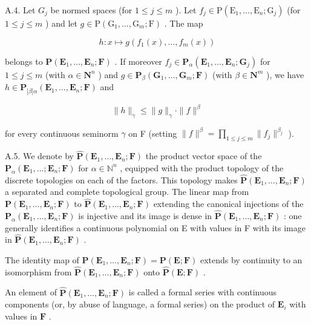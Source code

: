 A.4. Let \(G_{j}\) be normed spaces (for \(1 \leqslant j \leqslant m\) ). Let \(f_{j} \in \mathrm{P}(\mathrm{E}_{1}, \ldots, \mathrm{E}_{n}; \mathrm{G}_{j})\) (for \(1 \leqslant j \leqslant m\) ) and let \(g \in \mathrm{P}(\mathrm{G}_{1}, \ldots, \mathrm{G}_{m}; \mathrm{F})\) . The map

\[
h: x \mapsto g (f _ {1} (x), \dots , f _ {m} (x))
\]

belongs to \(\mathbf{P}(\mathbf{E}_1,\ldots ,\mathbf{E}_n;\mathbf{F})\) . If moreover \(f_{j}\in \mathbf{P}_{\alpha}(\mathbf{E}_{1},\ldots ,\mathbf{E}_{n};\mathbf{G}_{j})\) for \(1\leqslant j\leqslant m\) (with \(\alpha \in \mathbf{N}^n\) ) and \(g\in \mathbf{P}_{\beta}(\mathbf{G}_1,\ldots ,\mathbf{G}_m;\mathbf{F})\) (with \(\beta \in \mathbf{N}^{m}\) ), we have \(h\in \mathbf{P}_{|\beta |\alpha}(\mathbf{E}_1,\ldots ,\mathbf{E}_n;\mathbf{F})\) and

\[
\| h \| _ {\gamma} \leqslant \| g \| _ {\gamma} \cdot \| f \| ^ {\beta}
\]

for every continuous seminorm \(\gamma\) on F (setting \(\| f\|^{\beta} = \prod_{1 \leqslant j \leqslant m} \| f_j \|^{\beta_j}\) ).

A.5. We denote by \(\hat{\mathbf{P}}(\mathbf{E}_{1},\ldots,\mathbf{E}_{n};\mathbf{F})\) the product vector space of the \(\mathbf{P}_{\alpha}(\mathbf{E}_{1},\ldots;\mathbf{E}_{n};\mathbf{F})\) for \(\alpha\in\mathbb{N}^{n}\) , equipped with the product topology of the discrete topologies on each of the factors. This topology makes \(\hat{\mathbf{P}}(\mathbf{E}_{1},\ldots,\mathbf{E}_{n};\mathbf{F})\) a separated and complete topological group. The linear map from \(\mathbf{P}(\mathbf{E}_{1},\ldots,\mathbf{E}_{n};\mathbf{F})\) to \(\hat{\mathbf{P}}(\mathbf{E}_{1},\ldots,\mathbf{E}_{n};\mathbf{F})\) extending the canonical injections of the \(\mathbf{P}_{\alpha}(\mathbf{E}_{1},\ldots,\mathbf{E}_{n};\mathbf{F})\) is injective and its image is dense in \(\hat{\mathbf{P}}(\mathbf{E}_{1},\ldots,\mathbf{E}_{n};\mathbf{F})\) : one generally identifies a continuous polynomial on E with values in F with its image in \(\hat{\mathbf{P}}(\mathbf{E}_{1},\ldots,\mathbf{E}_{n};\mathbf{F})\) .

The identity map of \(\mathbf{P}(\mathbf{E}_{1},\ldots,\mathbf{E}_{n};\mathbf{F})=\mathbf{P}(\mathbf{E};\mathbf{F})\) extends by continuity to an isomorphism from \(\hat{\mathbf{P}}(\mathbf{E}_{1},\ldots,\mathbf{E}_{n};\mathbf{F})\) onto \(\hat{\mathbf{P}}(\mathbf{E};\mathbf{F})\) .

An element of \(\hat{\mathbf{P}}(\mathbf{E}_{1},\ldots,\mathbf{E}_{n};\mathbf{F})\) is called a formal series with continuous components (or, by abuse of language, a formal series) on the product of \(\mathbf{E}_{i}\) with values in \(\mathbf{F}\) .

